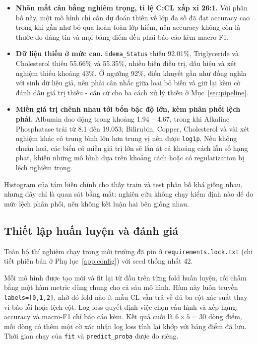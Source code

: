 \documentclass[12pt]{template/ai_conquer2026}
\begin{document}
\begin{itemize}
  \item \textbf{Nhãn mất cân bằng nghiêm trọng, tỉ lệ C:CL xấp xỉ 26:1.} Với phân
        bố này, một mô hình chỉ cần dự đoán thiên về lớp đa số đã đạt accuracy cao
        trong khi gần như bỏ qua hoàn toàn lớp hiếm, nên accuracy không còn là
        thước đo đáng tin và mọi bảng điểm đều phải báo cáo kèm macro-F1.
  \item \textbf{Dữ liệu thiếu ở mức cao.} \texttt{Edema\_Status} thiếu 92.01\%,
        Triglyceride và Cholesterol thiếu 55.66\% và 55.35\%, nhiều biến điều trị,
        dấu hiệu và xét nghiệm thiếu khoảng 43\%. Ở ngưỡng 92\%, điền khuyết gần
        như đồng nghĩa với sinh dữ liệu giả, nên phải cân nhắc giữa loại bỏ biến và
        giữ lại kèm cờ đánh dấu giá trị thiếu - căn cứ cho ba cách xử lý thiếu ở
        Mục~\ref{sec:pipeline}.
  \item \textbf{Miền giá trị chênh nhau tới bốn bậc độ lớn, kèm phân phối lệch
        phải.} Albumin dao động trong khoảng 1.94 -- 4.67, trong khi Alkaline
        Phosphatase trải từ 8.1 đến 19.053; Bilirubin, Copper, Cholesterol và vài
        xét nghiệm khác có trung bình lớn hơn trung vị nên được \texttt{log1p}. Nếu
        không chuẩn hoá, các biến có miền giá trị lớn sẽ lấn át cả khoảng cách lẫn
        số hạng phạt, khiến những mô hình dựa trên khoảng cách hoặc có
        regularization bị lệch nghiêm trọng.
\end{itemize}

Histogram của tám biến chính cho thấy train và test phân bố
khá giống nhau, nhưng đây chỉ là quan sát bằng mắt: nghiên cứu không chạy kiểm
định nào để đo mức lệch phân phối, nên không kết luận hai bên giống nhau.

\subsection{Thiết lập huấn luyện và đánh giá}

Toàn bộ thí nghiệm chạy trong môi trường đã pin ở
\texttt{requirements.lock.txt} (chi tiết phiên bản ở Phụ lục~\ref{app:config}) với
seed thống nhất 42.

Mỗi mô hình được tạo mới và fit lại từ đầu trên từng fold huấn luyện, rồi chấm
bằng một hàm metric dùng chung cho cả sáu mô hình. Hàm này luôn truyền
\texttt{labels=[0,1,2]}, nhờ đó fold nào ít mẫu CL vẫn trả về đủ ba cột xác suất
thay vì báo lỗi hoặc lệch cột. Log loss quyết định việc chọn cấu hình và xếp hạng;
accuracy và macro-F1 chỉ báo cáo kèm. Kết quả cuối là $6\times5=30$ dòng điểm, mỗi
dòng có thêm một cờ xác nhận log loss tính lại khớp với bảng điểm đã lưu. Thời
gian chạy của \texttt{fit} và \texttt{predict\_proba} được đo riêng.
\end{document}
